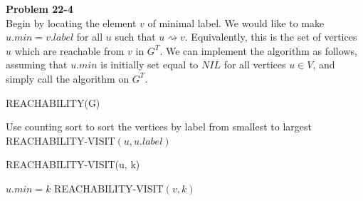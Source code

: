 \documentclass{article}
\begin{document}
\noindent\textbf{Problem 22-4}\\

Begin by locating the element $v$ of minimal label.  We would like to make $u.min = v.label$ for all $u$ such that $u \rightsquigarrow v$.  Equivalently, this is the set of vertices $u$ which are reachable from $v$ in $G^T$.  We can implement the algorithm as follows, assuming that $u.min$ is initially set equal to $NIL$ for all vertices $u \in V$, and simply call the algorithm on $G^{T}$.\\

\begin{algorithm}
\caption{REACHABILITY(G)}
\begin{algorithmic}[1]
\State Use counting sort to sort the vertices by label from smallest to largest
		\State REACHABILITY-VISIT$(u, u.label)$
	\EndIf
\EndFor
\end{algorithmic}
\end{algorithm}	
	
\begin{algorithm}
\caption{REACHABILITY-VISIT(u, k)}
\begin{algorithmic}[1]
\State $u.min = k$
		\State REACHABILITY-VISIT$(v,k)$
	\EndIf
\EndFor
\end{algorithmic}
\end{algorithm}
\end{document}

